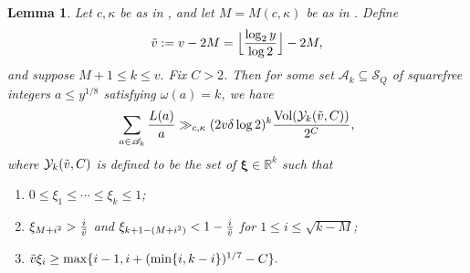 \documentclass{amsart}
\newtheorem{lemma}[theorem]{Lemma}
\theoremstyle{definition}
\numberwithin{equation}{section}
\renewcommand{\S}{\mathcal{S}}
\newcommand{\density}{\delta}
\DeclareMathOperator{\Vol}{Vol}
\begin{document}
	\begin{lemma}\label{lem from L to Yk}Let $c,\kappa$ be as in , and let $M=M(c,\kappa)$ be as in . Define $$\Tilde{v}:=v-2M=\Big\lfloor\frac{\log_2 y}{\log 2}\Big\rfloor - 2M,$$ and suppose $M+1 \leq k \leq v.$ Fix $C > 2$. Then for some set $\mathscr{A}_k \subseteq \S_Q$ of squarefree integers $a \leq y^{1/8}$ satisfying $\omega(a) = k$, we have
		$$\sum_{\substack{a \in \mathscr{A}_k}} \frac{L(a)}{a} \gg_{c,\kappa} (2v \density \log 2)^k \frac{\Vol(\mathcal{Y}_k(\Tilde{v},C))}{2^C}, $$
		where $\mathcal{Y}_k(\Tilde{v},C)$ is defined to be the set of $\bm{\xi} \in \mathbb{R}^k$ such that
		\begin{enumerate}[label=(\roman*)]
			\item $0 \leq \xi_1 \leq \cdots \leq \xi_k \leq 1$;
			\item $\xi_{M+i^2} > \frac{i}{\Tilde{v}}$ and $\xi_{k+1-(M+i^2)} < 1-\frac{i}{\Tilde{v}}$ for $1 \leq i \leq \sqrt{k-M}$;
			\item $\Tilde{v} \xi_i \geq \max\{i-1, i+ (\min\{i,k-i\})^{1/7}-C\}.$
		\end{enumerate}    
	\end{lemma}
	
\end{document}
